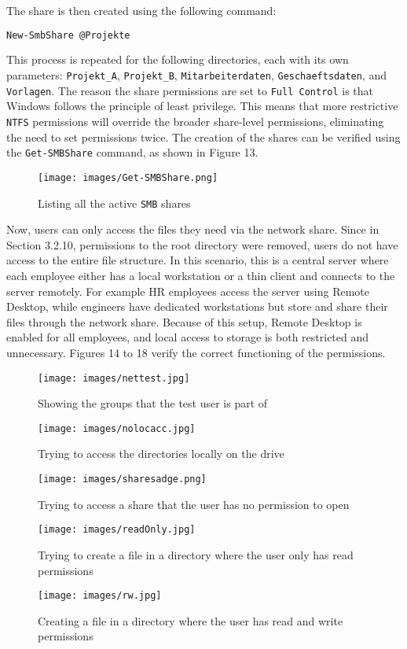 \documentclass[a4paper]{article}
\newcommand{\abc}{\hfill \break}
\begin{document}
The share is then created using the following command:

\begin{lstlisting}[language=PowerShell]
New-SmbShare @Projekte
\end{lstlisting}

This process is repeated for the following directories, each with its own parameters: \texttt{Projekt\_A}, \texttt{Projekt\_B}, \texttt{Mitarbeiterdaten}, \texttt{Geschaeftsdaten}, and \texttt{Vorlagen}.\cite{New-SmbShare}\abc
The reason the share permissions are set to \texttt{Full Control} is that Windows follows the principle of least privilege. This means that more restrictive \texttt{NTFS} permissions will override the broader share-level permissions, eliminating the need to set permissions twice. The creation of the shares can be verified using the \texttt{Get-SMBShare} command, as shown in Figure 13.\cite{share-and-ntfs-permissions}
\begin{figure}[!htb]
	\texttt{[image: images/Get-SMBShare.png]}
	\centering
	\caption{Listing all the active \texttt{SMB} shares}
\end{figure}
\newpage
Now, users can only access the files they need via the network share. Since in Section 3.2.10, permissions to the root directory were removed, users do not have access to the entire file structure. In this scenario, this is a central server where each employee either has a local workstation or a thin client and connects to the server remotely.\abc
For example HR employees access the server using Remote Desktop, while engineers have dedicated workstations but store and share their files through the network share. Because of this setup, Remote Desktop is enabled for all employees, and local access to storage is both restricted and unnecessary.\abc
Figures 14 to 18 verify the correct functioning of the permissions.
\begin{figure}[!htb]
	\texttt{[image: images/nettest.jpg]}
	\centering
	\caption{Showing the groups that the test user is part of}
\end{figure}
\begin{figure}[h]
	\texttt{[image: images/nolocacc.jpg]}
	\centering
	\caption{Trying to access the directories locally on the drive}
\end{figure}\newpage
\begin{figure}[h]
	\texttt{[image: images/sharesadge.png]}
	\centering
	\caption{Trying to access a share that the user has no permission to open}
\end{figure}
\begin{figure}[h]
	\texttt{[image: images/readOnly.jpg]}
	\centering
	\caption{Trying to create a file in a directory where the user only has read permissions}
\end{figure}
\begin{figure}[h]
	\texttt{[image: images/rw.jpg]}
	\centering
	\caption{Creating a file in a directory where the user has read and write permissions}
\end{figure}
\newpage
\end{document}
